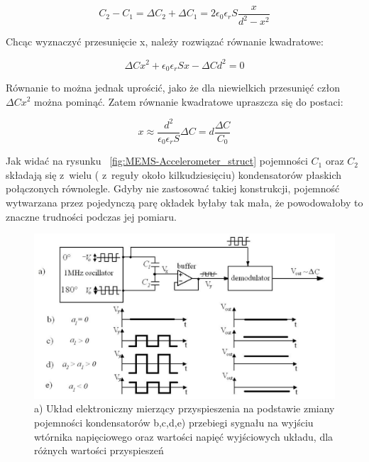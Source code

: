 \begin{equation}
	C_2 - C_1 = \Delta{C_2} + \Delta{C_1} = 2\epsilon_0\epsilon_rS\frac{x}{d^2 - x^2}
\end{equation}

Chcąc wyznaczyć przesunięcie x, należy rozwiązać równanie kwadratowe:

\begin{equation}
	\Delta{C}x^2 + \epsilon_0\epsilon_rSx - \Delta{C}d^2 = 0
\end{equation}

Równanie to można jednak uprościć, jako że dla niewielkich przesunięć człon $\Delta{C}x^2$ można pominąć. Zatem równanie kwadratowe upraszcza się do postaci:

\begin{equation}
	x \approx \frac{d^2}{\epsilon_0\epsilon_rS}\Delta{C} = d\frac{\Delta{C}}{C_0}
	\label{x_to_c}
\end{equation}

Jak widać na rysunku ~\ref{fig:MEMS-Accelerometer_struct} pojemności $C_1$ oraz $C_2$ składają się z~wielu ( z~reguły około kilkudziesięciu)  kondensatorów płaskich połączonych równolegle. Gdyby nie zastosować takiej konstrukcji, pojemność wytwarzana przez pojedynczą parę okładek byłaby tak mała, że powodowałoby to znaczne trudności podczas jej pomiaru. 

\begin{figure}[H]
	\centering
	\includegraphics[scale=0.4]{Pictures/MEMS_accel_demod.png}
		\caption[Układ elektroniczny do pomiaru różnicy pojemności kondensatorów]{a) Układ elektroniczny mierzący przyspieszenia na podstawie zmiany pojemności kondensatorów b,c,d,e) przebiegi sygnału na wyjściu wtórnika napięciowego oraz wartości napięć wyjściowych układu, dla różnych wartości przyspieszeń~\cite{mems12, mems13}}
	\label{fig:MEMS_accel_demod}
\end{figure}

